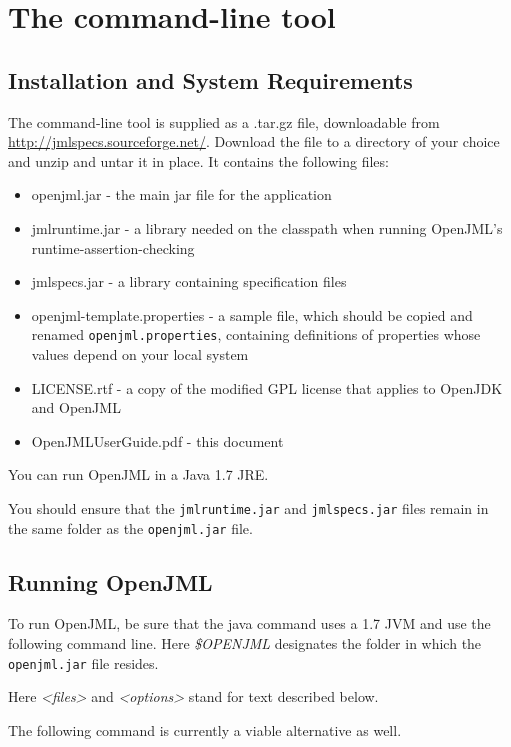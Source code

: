 
\chapter{The command-line tool}
\label{CommandLineTool}
\section{Installation and System Requirements}

The command-line tool is supplied as a .tar.gz file, downloadable from \url{http://jmlspecs.sourceforge.net/}.
Download the file to a directory of your choice and unzip and untar it in place.
It contains the following files:
\begin{itemize}\nospace
\item openjml.jar - the main jar file for the application
\item jmlruntime.jar - a library needed on the classpath when running OpenJML's runtime-assertion-checking
\item jmlspecs.jar - a library containing specification files
\item openjml-template.properties - a sample file, which should be copied and renamed {\tt openjml.properties}, containing definitions of properties whose values depend on your local system
\item LICENSE.rtf - a copy of the modified GPL license that applies to OpenJDK and OpenJML
\item OpenJMLUserGuide.pdf - this document
\end{itemize}

You can run OpenJML in a Java 1.7 JRE.

You should ensure that the {\tt jmlruntime.jar} and {\tt jmlspecs.jar} files remain in the same folder as the {\tt openjml.jar} file.


\section{Running OpenJML}
\label{Running}

To run OpenJML, be sure that the java command uses a 1.7 JVM and use the following command line. Here \textit{\$OPENJML} designates the folder in which the {\tt openjml.jar} file resides.

Here {\it <files>} and {\it <options>} stand for text described below.

The following command is currently a viable alternative as well.

